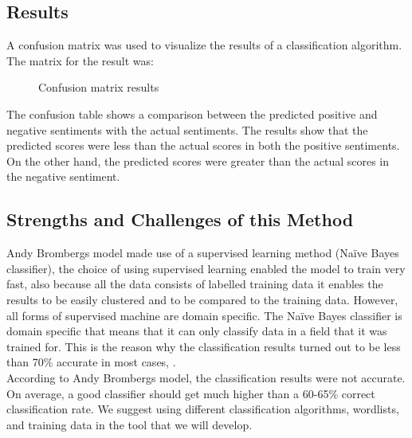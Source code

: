 \clearpage
\subsection{Results}

A confusion matrix was used to visualize the results of a classification algorithm. The matrix for
the result was:

\begin{figure}[h]
  \centering
  \caption[Confusion matrix results]%
  {Confusion matrix results}
  \label{fig:ALAP:sm3}
\end{figure}


The confusion table shows a comparison between the predicted positive and negative sentiments
with the actual sentiments. The results show that the predicted scores were less than the actual
scores in both the positive sentiments. On the other hand, the predicted scores were greater than
the actual scores in the negative sentiment.

\subsection{Strengths and Challenges of this Method}
Andy Bromberg\textquotesingle s model made use of a supervised learning method (Naïve Bayes classifier), the
choice of using supervised learning enabled the model to train very fast, also because all the data
consists of labelled training data it enables the results to be easily clustered and to be compared to
the training data. However, all forms of supervised machine are domain specific. The Naïve Bayes
classifier is domain specific that means that it can only classify data in a field that it was trained
for. This is the reason why the classification results turned out to be less than 70\% accurate in most
cases, \cite{ref31}.
\leavevmode\\
According to Andy Bromberg\textquotesingle s model, the classification results were not accurate. On average, a
good classifier should get much higher than a 60-65\% correct classification rate. We suggest using
different classification algorithms, wordlists, and training data in the tool that we will develop.



